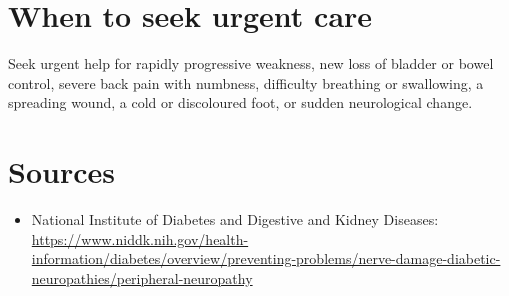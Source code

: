 \section*{When to seek urgent care}
Seek urgent help for rapidly progressive weakness, new loss of bladder or bowel control, severe back pain with numbness, difficulty breathing or swallowing, a spreading wound, a cold or discoloured foot, or sudden neurological change.

\section*{Sources}
\begin{itemize}
\item National Institute of Diabetes and Digestive and Kidney Diseases: \url{https://www.niddk.nih.gov/health-information/diabetes/overview/preventing-problems/nerve-damage-diabetic-neuropathies/peripheral-neuropathy}
\end{itemize}
